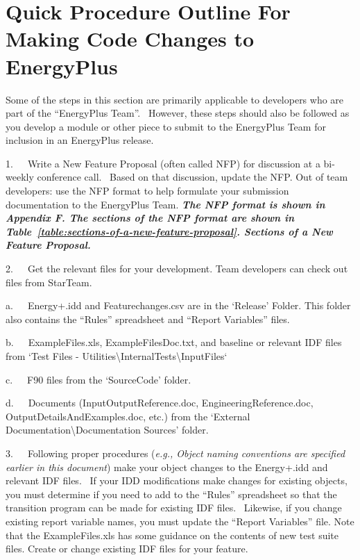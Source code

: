 \chapter{Quick Procedure Outline For Making Code Changes to EnergyPlus}\label{quick-procedure-outline-for-making-code-changes-to-energyplus}

Some of the steps in this section are primarily applicable to developers who are part of the ``EnergyPlus Team''.~ However, these steps should also be followed as you develop a module or other piece to submit to the EnergyPlus Team for inclusion in an EnergyPlus release.

1.~~~Write a New Feature Proposal (often called NFP) for discussion at a bi-weekly conference call.~ Based on that discussion, update the NFP. Out of team developers: use the NFP format to help formulate your submission documentation to the EnergyPlus Team. \textbf{\emph{The NFP format is shown in Appendix F. The sections of the NFP format are shown in}} \textbf{\emph{Table~\ref{table:sections-of-a-new-feature-proposal}. Sections of a New Feature Proposal.}}

2.~~~Get the relevant files for your development. Team developers can check out files from StarTeam.

a.~~~Energy+.idd and Featurechanges.csv are in the `Release' Folder. This folder also contains the ``Rules'' spreadsheet and ``Report Variables'' files.

b.~~~ExampleFiles.xls, ExampleFilesDoc.txt, and baseline or relevant IDF files from `Test Files - Utilities\textbackslash{}InternalTests\textbackslash{}InputFiles`

c.~~~F90 files from the `SourceCode' folder.

d.~~~Documents (InputOutputReference.doc, EngineeringReference.doc, OutputDetailsAndExamples.doc, etc.) from the `External Documentation\textbackslash{}Documentation Sources' folder.

3.~~~Following proper procedures (\emph{e.g., Object naming conventions are specified earlier in this document}) make your object changes to the Energy+.idd and relevant IDF files.~ If your IDD modifications make changes for existing objects, you must determine if you need to add to the ``Rules'' spreadsheet so that the transition program can be made for existing IDF files.~ Likewise, if you change existing report variable names, you must update the ``Report Variables'' file. Note that the ExampleFiles.xls has some guidance on the contents of new test suite files. Create or change existing IDF files for your feature.

